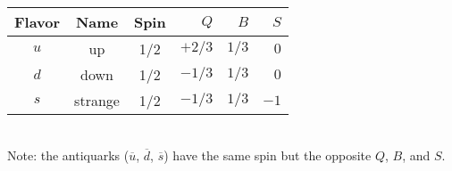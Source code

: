 \documentclass[11pt]{article}
\begin{document}
\begin{table}[tbp]
\begin{tabular}[tbp]{cccrrr}
Flavor & Name & Spin & $Q$ & $B$ & $S$ \\
\hline\hline
$u$ & up      & 1/2 & $+2/3$ & $1/3$ & $ 0$ \\[0.5ex]
$d$ & down    & 1/2 & $-1/3$ & $1/3$ & $ 0$ \\[0.5ex]
$s$ & strange & 1/2 & $-1/3$ & $1/3$ & $-1$ \\
\hline
\end{tabular}\\[0.5ex]
Note: the antiquarks ($\overline u$, $\overline d$, $\overline s$)
have the same spin but the opposite $Q$, $B$, and $S$.
\end{table}
\end{document}
